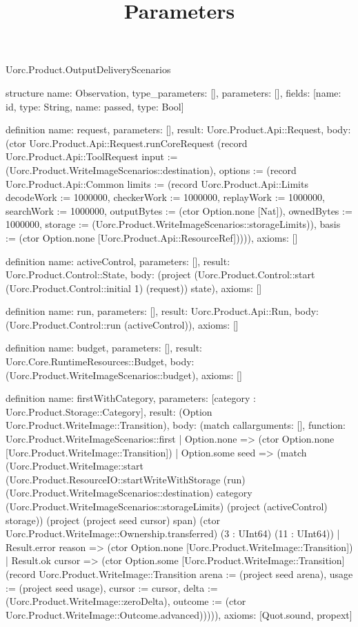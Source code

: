 \begin{lexlean}{Uorc.Product.OutputDeliveryScenarios}
\title{Parameters}
\begin{semanticmodule}
structure{
  name: Observation,
  type_parameters: [],
  parameters: [],
  fields: [{name: id, type: String}, {name: passed, type: Bool}]
}

definition{
  name: request,
  parameters: [],
  result: Uorc.Product.Api::Request,
  body: (ctor Uorc.Product.Api::Request.runCoreRequest (record Uorc.Product.Api::ToolRequest {input := (Uorc.Product.WriteImageScenarios::destination), options := (record Uorc.Product.Api::Common {limits := (record Uorc.Product.Api::Limits {decodeWork := 1000000, checkerWork := 1000000, replayWork := 1000000, searchWork := 1000000, outputBytes := (ctor Option.none [Nat]), ownedBytes := 1000000, storage := (Uorc.Product.WriteImageScenarios::storageLimits)}), basis := (ctor Option.none [Uorc.Product.Api::ResourceRef])})})),
  axioms: []
}

definition{
  name: activeControl,
  parameters: [],
  result: Uorc.Product.Control::State,
  body: (project (Uorc.Product.Control::start (Uorc.Product.Control::initial 1) (request)) state),
  axioms: []
}

definition{
  name: run,
  parameters: [],
  result: Uorc.Product.Api::Run,
  body: (Uorc.Product.Control::run (activeControl)),
  axioms: []
}

definition{
  name: budget,
  parameters: [],
  result: Uorc.Core.RuntimeResources::Budget,
  body: (Uorc.Product.WriteImageScenarios::budget),
  axioms: []
}

definition{
  name: firstWithCategory,
  parameters: [category : Uorc.Product.Storage::Category],
  result: (Option Uorc.Product.WriteImage::Transition),
  body: (match call{arguments: [], function: Uorc.Product.WriteImageScenarios::first}
    | Option.none => (ctor Option.none [Uorc.Product.WriteImage::Transition])
    | Option.some seed => (match (Uorc.Product.WriteImage::start (Uorc.Product.ResourceIO::startWriteWithStorage (run) (Uorc.Product.WriteImageScenarios::destination) category (Uorc.Product.WriteImageScenarios::storageLimits) (project (activeControl) storage)) (project (project seed cursor) span) (ctor Uorc.Product.WriteImage::Ownership.transferred) (3 : UInt64) (11 : UInt64))
      | Result.error reason => (ctor Option.none [Uorc.Product.WriteImage::Transition])
      | Result.ok cursor => (ctor Option.some [Uorc.Product.WriteImage::Transition] (record Uorc.Product.WriteImage::Transition {arena := (project seed arena), usage := (project seed usage), cursor := cursor, delta := (Uorc.Product.WriteImage::zeroDelta), outcome := (ctor Uorc.Product.WriteImage::Outcome.advanced)})))),
  axioms: [Quot.sound, propext]
}


\end{semanticmodule}
\end{lexlean}
